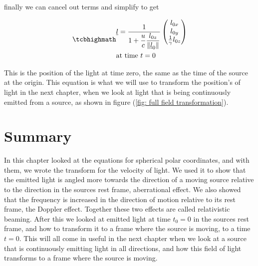

finally we can cancel out terms and simplify to get

\begin{equation}
	\label{eq: time synced transform}
	\mhl{
		\begin{aligned}
			 & \underline{l} =
			\dfrac{1}{ 1 + \dfrac{u}{c} \dfrac{l_{0z}}{\|\underline{l}_0\|} }
			\begin{pmatrix}
				l_{0x}                    \\
				l_{0y}                    \\
				\frac{1}{{\gamma}} l_{0z} \\
			\end{pmatrix}
			\\
			 & \text{at time ${t}=0$ }
		\end{aligned}
	}
\end{equation}

This is the position of the light at time zero, the same as the time of the source at the origin. This equation is what we will use to transform the position's of light in the next chapter, when we look at light that is being continuously emitted from a source, as shown in figure (\ref{fig: full field transformation}).

\section{Summary}\label{sect: Summary chapter 5}

In this chapter looked at the equations for spherical polar coordinates, and with them, we wrote the transform for the velocity of light.
We used it to show that the emitted light is angled more towards the direction of a moving source relative to the direction in the sources rest frame, aberrational effect.
We also showed that the frequency is increased in the direction of motion relative to its rest frame, the Doppler effect.
Together these two effects are called relativistic beaming.
After this we looked at emitted light at time $t_0=0$ in the sources rest frame, and how to transform it to a frame where the source is moving, to a time $t=0$.
This will all come in useful in the next chapter when we look at a source that is continuously emitting light in all directions, and how this field of light transforms to a frame where the source is moving.


